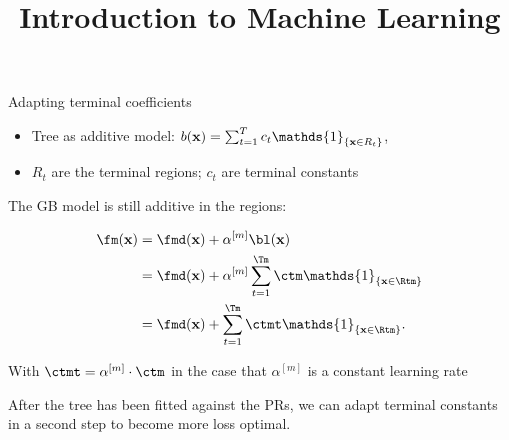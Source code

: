 \documentclass[11pt,compress,t,notes=noshow, xcolor=table]{beamer}
\title{Introduction to Machine Learning}
\begin{document}


\begin{vbframe}{Adapting terminal coefficients}

\begin{itemize}
\item Tree as additive model: $ b(\xv) = \sum_{t=1}^{T} c_t \mathds{1}_{\{\xv \in R_t\}} $,
\item $R_t$ are the terminal regions; $c_t$ are terminal constants 
\end{itemize}


\vspace*{0.2cm}

The GB model is still additive in the regions:

\begin{align*}
  \fm(\xv) &= \fmd(\xv) +  \alpha^{[m]} \bl(\xv) \\
         &= \fmd(\xv) +  \alpha^{[m]} \sum_{t=1}^{\Tm} \ctm \mathds{1}_{\{\xv \in \Rtm\}}\\
         &= \fmd(\xv) +  \sum_{t=1}^{\Tm} \ctmt \mathds{1}_{\{\xv \in \Rtm\}}.
\end{align*}

With $\ctmt = \alpha^{[m]} \cdot \ctm$ in the case that $\alpha^{[m]}$ is a constant learning rate


\framebreak
\begin{small}
After the tree has been fitted against the PRs, we can adapt terminal constants in a second step to become more loss optimal.


\end{small}
\end{vbframe}
\end{document}
